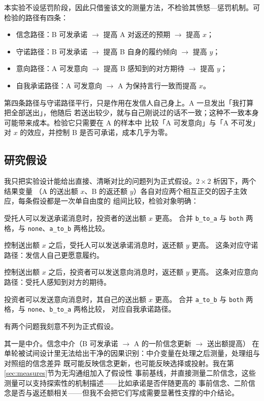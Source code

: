 \documentclass[10pt,a4paper]{ctexart}
\newcommand{\code}[1]{\texttt{#1}}
\begin{document}
本实验不设惩罚阶段，因此只借鉴该文的测量方法，不检验其愤怒—惩罚机制。可检验的路径有四条：

\begin{itemize}
  \item 信念路径：B 可发承诺 $\rightarrow$ 提高 A 对返还的预期 $\rightarrow$ 提高 $x$；
  \item 守诺路径：B 可发承诺 $\rightarrow$ 提高 B 自身的履约倾向 $\rightarrow$ 提高 $y$；
  \item 意向路径：A 可发意向 $\rightarrow$ 提高 B 感知到的对方期待 $\rightarrow$ 提高 $y$；
  \item 自我承诺路径：A 可发意向 $\rightarrow$ A 为保持言行一致而提高 $x$。
\end{itemize}

第四条路径与守诺路径平行，只是作用在发信人自己身上。A 一旦发出「我打算把全部送出」，他随后
若送出较少，就与自己刚说过的话不一致；这种不一致本身可能带来成本。检验它只需要在 A 的样本中
比较「A 可发意向」与「A 不可发」对 $x$ 的效应，并控制 B 是否可承诺，成本几乎为零。

\subsection{研究假设}

我只把实验设计能给出直接、清晰对比的问题列为正式假设。$2\times2$ 析因下，两个结果变量
（A 的送出额 $x$、B 的返还额 $y$）各自对应两个相互正交的因子主效应，每条假设都是一次单自由度的
组间比较，检验对象明确：

\begin{description}[style=nextline]
  \item[H1（主结果）] 受托人可以发送承诺消息时，投资者的送出额 $x$ 更高。
        合并 \code{b\_to\_a} 与 \code{both} 两格，与 \code{none}、\code{a\_to\_b} 两格比较。
  \item[H2] 控制送出额 $x$ 之后，受托人可以发送承诺消息时，返还额 $y$ 更高。
        这条对应守诺路径：发信人自己更愿意履约。
  \item[H3] 控制送出额 $x$ 之后，投资者可以发送意向消息时，返还额 $y$ 更高。
        这条对应意向路径：受托人感知到对方的期待。
  \item[H4] 投资者可以发送意向消息时，其自己的送出额 $x$ 更高。
        合并 \code{a\_to\_b} 与 \code{both} 两格，与 \code{none}、\code{b\_to\_a} 两格比较，
        对应自我承诺路径。
\end{description}

有两个问题我刻意不列为正式假设。

其一是中介。信念中介（B 可发承诺 $\rightarrow$ A 的一阶信念更新 $\rightarrow$ 送出额提高）
在单轮被试间设计里无法给出干净的因果识别：中介变量在处理之后测量，处理组与对照组的信念差异
既可能反映信念更新，也可能反映选择或投射。我在第\ref{sec:measures}节为无沟通组加入了假设性
事前基线，并直接测量二阶信念，这些测量可以支持探索性的机制描述——比如承诺是否伴随更高的
事前信念、二阶信念是否与返还额相关——但我不会把它们写成需要显著性支撑的中介结论。
\end{document}
